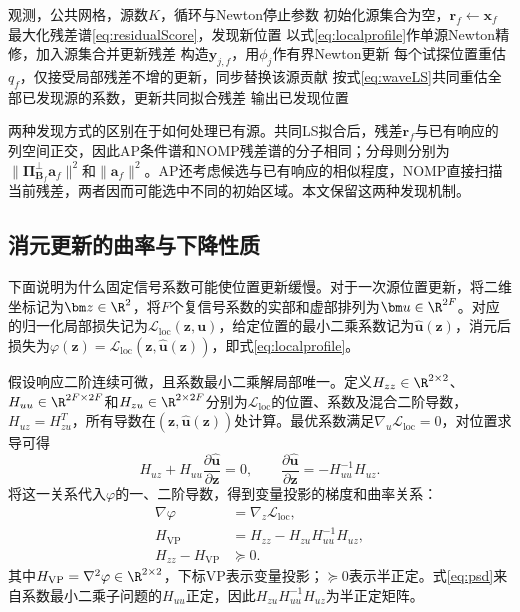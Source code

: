 \begin{algorithm}[H]
\caption{波形消元块NOMP}\label{alg:nomp}
\begin{algorithmic}[1]
\Require 观测，公共网格，源数$K$，循环与Newton停止参数
\State 初始化源集合为空，$\bm r_f\gets\bm x_f$
  \State 最大化残差谱\eqref{eq:residualScore}，发现新位置
  \State 以式\eqref{eq:localprofile}作单源Newton精修，加入源集合并更新残差
  \Repeat
      \State 构造$\bm y_{j,f}$，用$\phi_j$作有界Newton更新
      \State 每个试探位置重估$q_f$，仅接受局部残差不增的更新，同步替换该源贡献
    \EndFor
  \State 按式\eqref{eq:waveLS}共同重估全部已发现源的系数，更新共同拟合残差
\EndFor
\State 输出已发现位置
\end{algorithmic}
\end{algorithm}

两种发现方式的区别在于如何处理已有源。共同LS拟合后，残差$\bm r_f$与已有响应的列空间正交，因此AP条件谱和NOMP残差谱的分子相同；分母则分别为$\|\bm\Pi_{\bm B_f}^{\perp}\bm a_f\|^2$和$\|\bm a_f\|^2$。AP还考虑候选与已有响应的相似程度，NOMP直接扫描当前残差，两者因而可能选中不同的初始区域。本文保留这两种发现机制。

\subsection{消元更新的曲率与下降性质}\label{sec:curvature}
下面说明为什么固定信号系数可能使位置更新缓慢。对于一次源位置更新，将二维坐标记为$\bm z\in\R^2$，将$F$个复信号系数的实部和虚部排列为$\bm u\in\R^{2F}$。对应的归一化局部损失记为$\mathcal L_{\mathrm{loc}}(\bm z,\bm u)$，给定位置的最小二乘系数记为$\widehat{\bm u}(\bm z)$，消元后损失为$\varphi(\bm z)=\mathcal L_{\mathrm{loc}}(\bm z,\widehat{\bm u}(\bm z))$，即式\eqref{eq:localprofile}。

假设响应二阶连续可微，且系数最小二乘解局部唯一。定义$H_{zz}\in\R^{2\times2}$、$H_{uu}\in\R^{2F\times2F}$和$H_{zu}\in\R^{2\times2F}$分别为$\mathcal L_{\mathrm{loc}}$的位置、系数及混合二阶导数，$H_{uz}=H_{zu}^T$，所有导数在$(\bm z,\widehat{\bm u}(\bm z))$处计算。最优系数满足$\nabla_u\mathcal L_{\mathrm{loc}}=0$，对位置求导可得
\begin{equation}
 H_{uz}+H_{uu}\frac{\partial\widehat{\bm u}}{\partial\bm z}=0,
 \qquad\frac{\partial\widehat{\bm u}}{\partial\bm z}
 =-H_{uu}^{-1}H_{uz}.\label{eq:coefficientDerivative}
\end{equation}
将这一关系代入$\varphi$的一、二阶导数，得到变量投影的梯度和曲率关系\cite{GolubPereyra1973}：
\begin{align}
 \nabla\varphi&=\nabla_z\mathcal L_{\mathrm{loc}},\label{eq:envelope}\\
 H_{\mathrm{VP}}&=H_{zz}-H_{zu}H_{uu}^{-1}H_{uz},\label{eq:schur}\\
 H_{zz}-H_{\mathrm{VP}}&\succeq0 .\label{eq:psd}
\end{align}
其中$H_{\mathrm{VP}}=\nabla^2\varphi\in\R^{2\times2}$，下标VP表示变量投影；$\succeq0$表示半正定。式\eqref{eq:psd}来自系数最小二乘子问题的$H_{uu}$正定，因此$H_{zu}H_{uu}^{-1}H_{uz}$为半正定矩阵。

